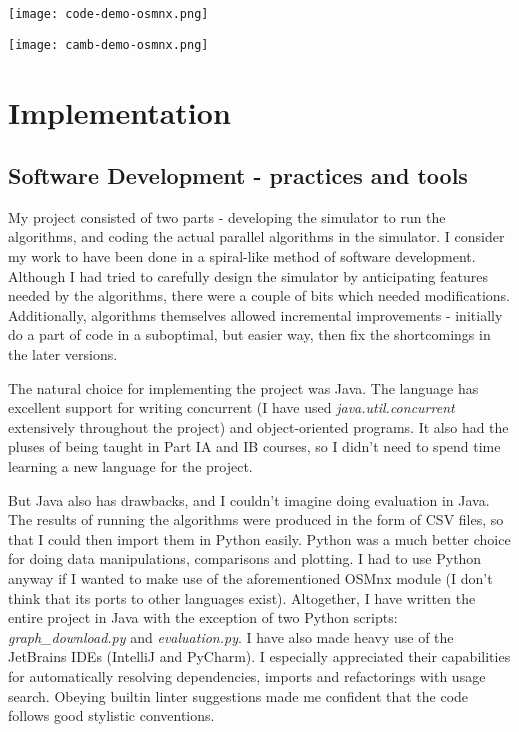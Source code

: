 \documentclass[12pt,a4paper,twoside,openright]{report}
\begin{document}
\texttt{[image: code-demo-osmnx.png]}
\begin{center}\texttt{[image: camb-demo-osmnx.png]}\end{center}


\chapter{Implementation}

\section{Software Development - practices and tools}
My project consisted of two parts - developing the simulator to run the algorithms, and coding the actual parallel algorithms in the simulator. I consider my work to have been done in a spiral-like method of software development. Although I had tried to carefully design the simulator by anticipating features needed by the algorithms, there were a couple of bits which needed modifications. Additionally, algorithms themselves allowed incremental improvements - initially do a part of code in a suboptimal, but easier way, then fix the shortcomings in the later versions.  

The natural choice for implementing the project was Java. The language has excellent support for writing concurrent (I have used \textit{java.util.concurrent} extensively throughout the project) and object-oriented programs. It also had the pluses of being taught in Part IA and IB courses, so I didn't need to spend time learning a new language for the project.

But Java also has drawbacks, and I couldn't imagine doing evaluation in Java. The results of running the algorithms were produced in the form of CSV files, so that I could then import them in Python easily. Python was a much better choice for doing data manipulations, comparisons and plotting. I had to use Python anyway if I wanted to make use of the aforementioned OSMnx module (I don't think that its ports to other languages exist). Altogether, I have written the entire project in Java with the exception of two Python scripts: \textit{graph\_download.py} and \textit{evaluation.py}. I have also made heavy use of the JetBrains IDEs (IntelliJ and PyCharm). I especially appreciated their capabilities for automatically resolving dependencies, imports and refactorings with usage search. Obeying builtin linter suggestions made me confident that the code follows good stylistic conventions.
\end{document}
